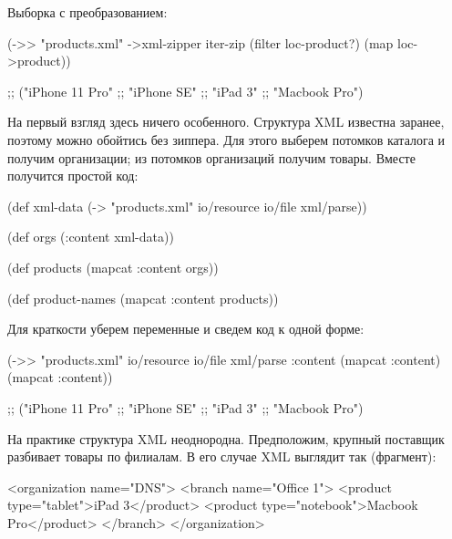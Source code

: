 Выборка с преобразованием:

\begin{english}
  \begin{clojure}
(->> "products.xml"
     ->xml-zipper
     iter-zip
     (filter loc-product?)
     (map loc->product))

;; ("iPhone 11 Pro"
;;  "iPhone SE"
;;  "iPad 3"
;;  "Macbook Pro")
  \end{clojure}
\end{english}

На первый взгляд здесь ничего особенного. Структура XML известна заранее,
поэтому можно обойтись без зиппера. Для этого выберем потомков каталога и
получим организации; из потомков организаций получим товары. Вместе получится
простой код:


\begin{english}
  \begin{clojure}
(def xml-data
  (-> "products.xml"
      io/resource
      io/file
      xml/parse))

(def orgs
  (:content xml-data))

(def products
  (mapcat :content orgs))

(def product-names
  (mapcat :content products))
  \end{clojure}
\end{english}

\pagebreaklarge

Для краткости уберем переменные и сведем код к одной форме:

\begin{english}
  \begin{clojure}
(->> "products.xml"
     io/resource
     io/file
     xml/parse
     :content
     (mapcat :content)
     (mapcat :content))

;; ("iPhone 11 Pro"
;;  "iPhone SE"
;;  "iPad 3"
;;  "Macbook Pro")
  \end{clojure}
\end{english}

На практике структура XML неоднородна. Предположим, крупный поставщик разбивает
товары по филиалам. В его случае XML выглядит так (фрагмент):

\begin{english}
  \begin{xml}
<organization name="DNS">
  <branch name="Office 1">
    <product type="tablet">iPad 3</product>
    <product type="notebook">Macbook Pro</product>
  </branch>
</organization>
  \end{xml}
\end{english}

